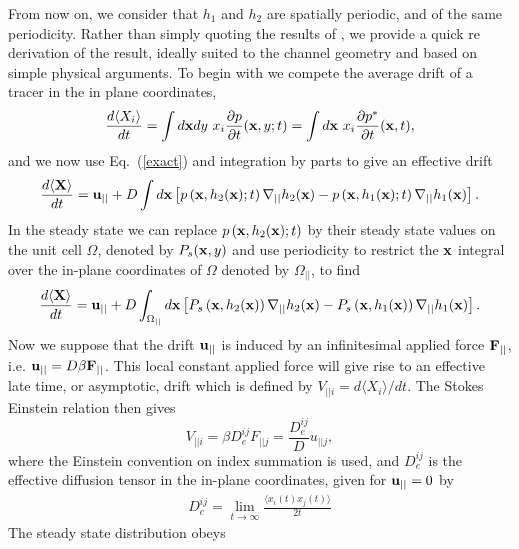 \documentclass[pre,showpacs,preprintnumbers,amsmath,amssymb,superscriptaddress]{revtex4-1}
\begin{document}
From now on, we consider that $h_1$ and $h_2$ are spatially periodic, and of the same periodicity. Rather than simply quoting the results of \cite{gue2015a,gue2015b}, we provide a quick re derivation of the result, ideally suited to the channel geometry and based on simple physical arguments. To begin with we compete the average drift of 
a tracer in the in plane coordinates,
\begin{equation}
\frac{d\langle X_i\rangle}{dt} = \int d{\bf x} dy \ x_i \frac{\partial p}{\partial t}({\bf x},y;t) = \int d{\bf x}\ x_i \frac{\partial p^*}{\partial t}({\bf x},t),
\end{equation}
and we now use Eq.~({\ref{exact}) and integration by parts to give an effective drift
\begin{equation}
\frac{d\langle {\bf X}\rangle}{dt} = {\bf u}_{||} + D \int d{\bf x} \left[ p\left({\bf x},h_2({\bf x});t\right) \nabla_{||}h_2({\bf x}) -
p\left({\bf x},h_1({\bf x});t\right) \nabla_{||}h_1({\bf x}) \right].
\end{equation}
In the steady state we can replace $p\left({\bf x},h_2({\bf x});t\right)$ by their steady state values on the unit cell $\Omega$,
denoted by $P_s({\bf x},y)$ and use periodicity to restrict the ${\bf x}$ integral over the in-plane coordinates of $\Omega$ denoted by $\Omega_{||}$, to find
\begin{equation}
\frac{d\langle {\bf X}\rangle}{dt} = {\bf u}_{||} + D \int_{\Omega_{||}} d{\bf x} \left[ P_s\left({\bf x},h_2({\bf x})\right) \nabla_{||}h_2({\bf x}) -
P_s\left({\bf x},h_1({\bf x})\right) \nabla_{||}h_1({\bf x}) \right].
\end{equation}
Now we  suppose that  the drift ${\bf u}_{||}$ is induced by an infinitesimal applied force ${\bf F}_{||}$, i.e. ${\bf u}_{||} = D\beta {\bf F}_{||}$. This local constant applied force will give rise to an effective late time, or asymptotic, drift which is defined by $V_{||i} = d \langle X_i \rangle/dt$.  The Stokes Einstein relation then gives
\begin{equation}
V_{||i} = \beta D_{e}^{ij}{F}_{||j} = \frac{D_{e}^{ij}}{D}{u}_{||j},
\end{equation}
where the Einstein convention on index summation is used, and $D_{e}^{ij}$ is the effective diffusion tensor in the in-plane coordinates, given for ${\bf u}_{||}=0$ by
\begin{align}
D_{e}^{ij}=\lim_{t\rightarrow\infty} \frac{\langle x_i(t)x_j(t)\rangle}{2t}
\end{align}
The steady state distribution obeys
\begin{equation}

\end{equation}}
\end{document}
